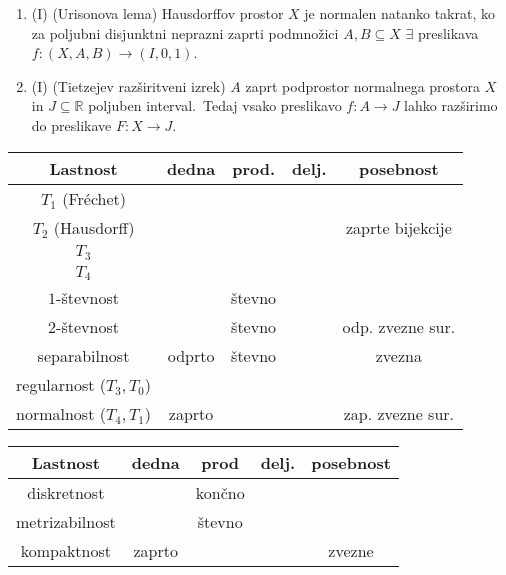 \documentclass[10pt,a4paper]{article}
\newcommand{\cmark}{\checkmark}%
\newcommand{\xmark}{\ding{55}}%
\begin{document}
\begin{enumerate}
\item (I) (Urisonova lema) Hausdorffov prostor $X$ je normalen natanko takrat, ko za poljubni disjunktni neprazni zaprti podmnožici $A,B\subseteq X$ $\exists$ preslikava $f:(X,A,B)\to(I,0,1)$.
            
\item (I) (Tietzejev razširitveni izrek)  $A$ zaprt podprostor normalnega prostora $X$ in $J\subseteq\mathbb{R}$ poljuben interval.~Tedaj vsako preslikavo $f:A\to J$ lahko razširimo do preslikave $F:X\to J$.
        \end{enumerate}


\begin{table}
    \begin{tabular}{|c|c|c|c|c|}\hline
        Lastnost                & dedna & prod. & delj. & posebnost         \\ \hline
        $T_1$ (Fréchet)         & \cmark& \cmark& \xmark&                   \\ \hline
        $T_2$ (Hausdorff)       & \cmark& \cmark& \xmark& zaprte bijekcije  \\ \hline
        $T_3$                   & \cmark& \cmark& \xmark&                   \\ \hline
        $T_4$                   &       &   	& \xmark&                   \\ \hline
        $1$-števnost            & \cmark& števno& \xmark&                   \\ \hline
        $2$-števnost            & \cmark& števno& \xmark& odp. zvezne sur.  \\ \hline
        separabilnost           & odprto& števno& \cmark& zvezna            \\ \hline
        regularnost ($T_3, T_0$)& \cmark& \cmark&       &                   \\ \hline
        normalnost ($T_4, T_1$) & zaprto&       &       & zap. zvezne sur.  \\ \hline
    \end{tabular}
    \begin{tabular}{|c|c|c|c|c|} \hline
        Lastnost          & dedna & prod  & delj. & posebnost     \\ \hline
        diskretnost       & \cmark& končno& \cmark&               \\ \hline
        metrizabilnost    & \cmark& števno& \xmark&               \\ \hline
        kompaktnost       & zaprto& \cmark& \cmark& zvezne        \\ \hline

\end{tabular}
\end{table}
\end{document}
